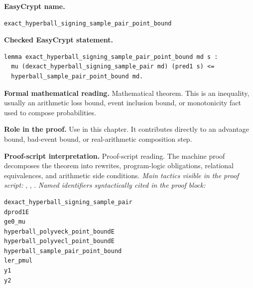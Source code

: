 \begin{formaltheorem}
\noindent\textbf{EasyCrypt name.}
\begin{lstlisting}[language=EasyCrypt,basicstyle=\ttfamily\scriptsize]
exact_hyperball_signing_sample_pair_point_bound
\end{lstlisting}
\noindent\textbf{Checked EasyCrypt statement.}
\begin{lstlisting}[language=EasyCrypt,basicstyle=\ttfamily\scriptsize]
lemma exact_hyperball_signing_sample_pair_point_bound md s :
  mu (dexact_hyperball_signing_sample_pair md) (pred1 s) <=
  hyperball_sample_pair_point_bound md.
\end{lstlisting}
\noindent\textbf{Formal mathematical reading.}
Mathematical theorem. This is an inequality, usually an arithmetic loss bound, event inclusion bound, or monotonicity fact used to compose probabilities.

\noindent\textbf{Role in the proof.}
Use in this chapter. It contributes directly to an advantage bound, bad-event bound, or real-arithmetic composition step.

\noindent\textbf{Proof-script interpretation.}
Proof-script reading. The machine proof decomposes the theorem into rewrites, program-logic obligations, relational equivalences, and arithmetic side conditions.
\emph{Main tactics visible in the proof script:} , , .
\emph{Named identifiers syntactically cited in the proof block:}
\begin{lstlisting}[language=EasyCrypt,basicstyle=\ttfamily\scriptsize]
dexact_hyperball_signing_sample_pair
dprod1E
ge0_mu
hyperball_polyveck_point_boundE
hyperball_polyvecl_point_boundE
hyperball_sample_pair_point_bound
ler_pmul
y1
y2
\end{lstlisting}

\end{formaltheorem}

